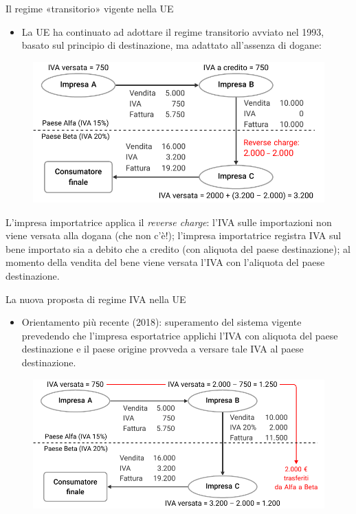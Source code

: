 \documentclass[aspectratio=64,11pt]{beamer}
\begin{document}
\begin{frame}{Il regime «transitorio» vigente nella UE}
\begin{itemize}
\item La UE ha continuato ad adottare il \alert{regime transitorio} avviato nel 1993,
basato sul principio di \alert{destinazione}, ma adattato all'assenza di dogane:
\end{itemize}

\begin{figure}[htbp]
\centering
\includegraphics[width=.8\textwidth]{./figure/IVA-intracomunitaria.pdf}
\end{figure}

\footnotesize
L'impresa importatrice applica il \emph{reverse charge}: l'IVA sulle importazioni
non viene versata alla dogana (che non c'è!); l'impresa importatrice registra
IVA sul bene importato sia a debito che a credito (con aliquota del paese
destinazione); al momento della vendita del bene viene versata l'IVA con
l'aliquota del paese destinazione.
\end{frame}


\begin{frame}{La nuova proposta di regime IVA nella UE}
\begin{itemize}
\item Orientamento più recente (2018): superamento del sistema vigente prevedendo
che l'impresa esportatrice applichi l'IVA con aliquota del paese
destinazione e il paese origine provveda a versare tale IVA al paese
destinazione.
\end{itemize}


\begin{figure}[htbp]
\centering
\includegraphics[width=.9\textwidth]{./figure/IVA-proposta-2018.pdf}
\end{figure}
\end{frame}
\end{document}
